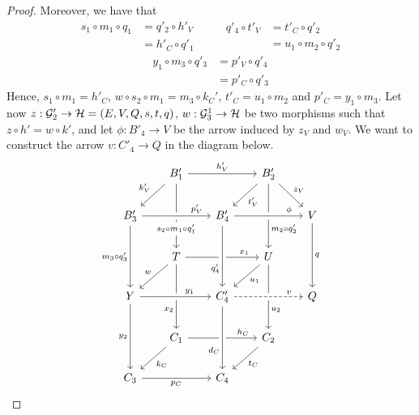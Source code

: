 \begin{proof}
	Moreover, we have that
	\[
		\begin{split}
			s_1 \circ m_1 \circ q_1 &= q'_2 \circ h'_V \\ &= h'_C \circ q'_1
		\end{split}\qquad\begin{split}
			q'_4 \circ t'_V &= t'_C \circ q'_2\\ &= u_1\circ m_2 \circ q'_2
		\end{split}
	\]\[
		\begin{split}
			y_1 \circ m_3 \circ q'_3 &= p'_V \circ q'_4\\ &= p'_C \circ q'_3
		\end{split}%
	\]
	Hence, $s_1\circ m_1 = h'_C$, $w \circ s_2 \circ m_1 = m_3 \circ k_C'$, $t'_C = u_1 \circ m_2$ and $p'_C = y_1 \circ m_3$.
	Let now $z: \mathcal{G}'_2 \to \mathcal{H} = (E, V, Q, s, t, q)$, $w: \mathcal{G}_3^1 \to \mathcal{H}$ be two morphisms such that $z \circ h' = w \circ k'$, and let $\phi:B'_4 \to V$ be the arrow induced by $z_V$ and $w_V$. We want to construct the arrow $v: C'_4 \to Q$ in the diagram below.
	\[\begin{tikzcd}[row sep = 20, column sep = 20]
	& {B_1'} && {B_2'} \\
	{B_3'} && {B_4'} && V \\
	& T && U \\
	Y && {C_4'} && Q \\
	& {C_1} && {C_2} \\
	{C_3} && {C_4}
	\arrow["{h_V'}", from=1-2, to=1-4]
	\arrow["{k_V'}"', from=1-2, to=2-1]
	\arrow["{s_2\circ m_1 \circ q_1'}"{description, pos=0.7}, from=1-2, to=3-2]
	\arrow["{t_V'}", from=1-4, to=2-3]
	\arrow["{z_V}", from=1-4, to=2-5]
	\arrow["{m_2\circ q'_2}"{pos=0.7}, from=1-4, to=3-4]
	\arrow["{m_3 \circ q'_3}"', from=2-1, to=4-1]
	\arrow["q", from=2-5, to=4-5]
	\arrow["{x_1}"{pos=0.8}, from=3-2, to=3-4]
	\arrow["w"', from=3-2, to=4-1]
	\arrow["{x_2}"'{pos=0.7}, from=3-2, to=5-2]
	\arrow["{u_1}", from=3-4, to=4-3]
	\arrow["{u_2}"{pos=0.7}, from=3-4, to=5-4]
	\arrow["{y_2}"', from=4-1, to=6-1]
	\arrow["{h_C}"{pos=0.8}, from=5-2, to=5-4]
	\arrow["{k_C}", from=5-2, to=6-1]
	\arrow["{t_C}", from=5-4, to=6-3]
	\arrow["{p_C}"', from=6-1, to=6-3]
	\arrow["{p_V'}"{pos=0.8}, from=2-1, to=2-3, crossing over]
	\arrow["\phi"{pos=0.8}, from=2-3, to=2-5, crossing over]
	\arrow["{q'_4}"'{pos=0.7}, from=2-3, to=4-3, crossing over]
	\arrow["{y_1}"{pos=0.7}, from=4-1, to=4-3, crossing over]
	\arrow["{d_C}"'{pos=0.7}, from=4-3, to=6-3, crossing over]
	\arrow["v"{pos=0.8}, dashed, from=4-3, to=4-5, crossing over]
	\end{tikzcd}\]
	

\end{proof}
